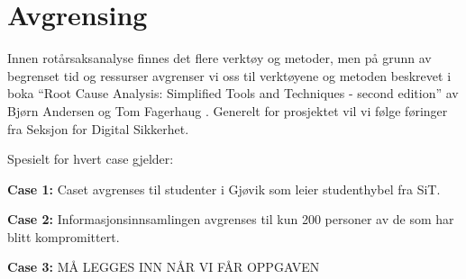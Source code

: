 \section{Avgrensing}
\label{sec:avgrensing}
Innen rotårsaksanalyse finnes det flere verktøy og metoder, men på grunn av begrenset tid og ressurser avgrenser vi oss til verktøyene og metoden beskrevet i boka ``Root Cause Analysis: Simplified Tools and Techniques - second edition'' av Bjørn Andersen og Tom Fagerhaug \cite{RCA}. Generelt for prosjektet vil vi følge føringer fra Seksjon for Digital Sikkerhet.

\noindent Spesielt for hvert case gjelder:

\textbf{Case 1:}
Caset avgrenses til studenter i Gjøvik som leier studenthybel fra SiT.

\textbf{Case 2:}
Informasjonsinnsamlingen avgrenses til kun 200 personer av de som har blitt kompromittert. 

\textbf{Case 3:}
MÅ LEGGES INN NÅR VI FÅR OPPGAVEN
